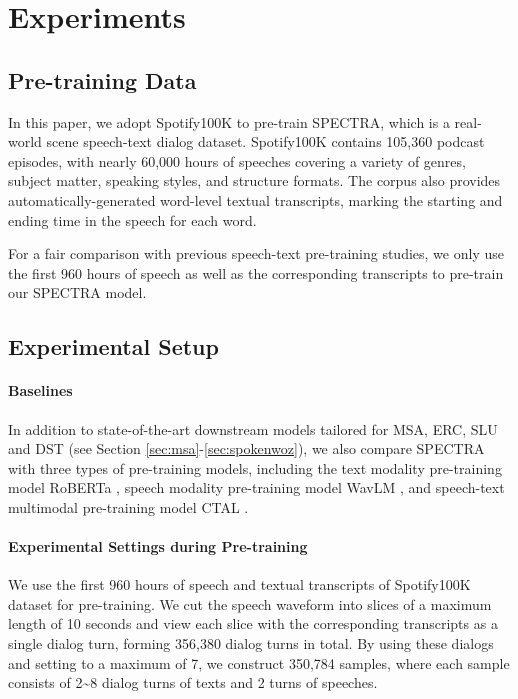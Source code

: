 \documentclass[11pt]{article}
\begin{document}
\section{Experiments}

\subsection{Pre-training Data}
In this paper, we adopt Spotify100K \citep{clifton-etal-2020-100000} to pre-train SPECTRA, which is a real-world scene speech-text dialog dataset.
Spotify100K contains 105,360 podcast episodes, with nearly 60,000 hours of speeches covering a variety of genres, subject matter, speaking styles, and structure formats.
The corpus also provides automatically-generated word-level textual transcripts, marking the starting and ending time in the speech for each word.

For a fair comparison with previous speech-text pre-training studies, we only use the first 960 hours of speech as well as the corresponding transcripts to pre-train our SPECTRA model.


\subsection{Experimental Setup}
\paragraph{Baselines}
In addition to state-of-the-art downstream models tailored for MSA, ERC, SLU and DST (see Section \ref{sec:msa}-\ref{sec:spokenwoz}), we also compare SPECTRA with three types of pre-training models, including the text modality pre-training model RoBERTa \cite{roberta}, speech modality pre-training model WavLM \cite{wavlm}, and speech-text multimodal pre-training model CTAL \cite{ctal}. 








\paragraph{Experimental Settings during Pre-training}
We use the first 960 hours of speech and textual transcripts of Spotify100K dataset for pre-training. 
We cut the speech waveform into slices of a maximum length of 10 seconds and view each slice with the corresponding transcripts as a single dialog turn, forming 356,380 dialog turns in total. 
By using these dialogs and setting  to a maximum of 7, we construct 350,784 samples, where each sample consists of 2\textasciitilde 8 dialog turns of texts and 2 turns of speeches. 
\end{document}
